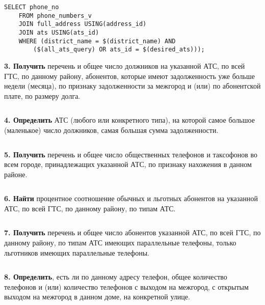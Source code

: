 \documentclass{report}
\begin{document}
\begin{lstlisting}
SELECT phone_no 
    FROM phone_numbers_v
    JOIN full_address USING(address_id)
    JOIN ats USING(ats_id)
    WHERE (district_name = $(district_name) AND 
        ($(all_ats_query) OR ats_id = $(desired_ats)));
\end{lstlisting}

\textbf{3. Получить} перечень и общее число должников на указанной АТС, 
по всей ГТС, по данному району, абонентов, которые имеют задолженность 
уже больше недели (месяца), по признаку задолженности за межгород и (или) 
по абонентской плате, по размеру долга.

\begin{lstlisting}

\end{lstlisting}

\textbf{4. Определить} АТС (любого или конкретного типа), на которой 
самое большое (маленькое) число должников, самая большая сумма задолженности.

\begin{lstlisting}

\end{lstlisting}

\textbf{5. Получить} перечень и общее число общественных телефонов и 
таксофонов во всем городе, принадлежащих указанной АТС, по признаку 
нахожения в данном районе.

\begin{lstlisting}

\end{lstlisting}

\textbf{6. Найти} процентное соотношение обычных и льготных абонентов 
на указанной АТС, по всей ГТС, по данному району, по типам АТС.

\begin{lstlisting}

\end{lstlisting}

\textbf{7. Получить} перечень и общее число абонентов указанной АТС, 
по всей ГТС, по данному району, по типам АТС имеющих параллельные телефоны, 
только льготников имеющих параллельные телефоны.

\begin{lstlisting}

\end{lstlisting}

\textbf{8. Определить}, есть ли по данному адресу телефон, общее 
количество телефонов и (или) количество телефонов с выходом на межгород, 
с открытым выходом на межгород в данном доме, на конкретной улице.
\end{document}
